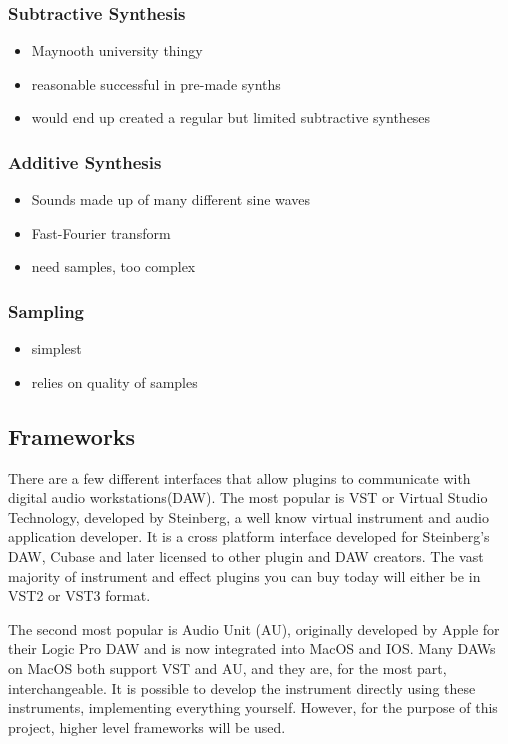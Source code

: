 \documentclass[12pt]{article}
\begin{document}
	\subsubsection{Subtractive Synthesis}
	\begin{itemize}
		\item Maynooth university thingy
		\item reasonable successful in pre-made synths
		\item would end up created a regular but limited subtractive syntheses
	\end{itemize}
	
	\subsubsection{Additive Synthesis}
	\begin{itemize}
		\item Sounds made up of many different sine waves
		\item Fast-Fourier transform
		\item need samples, too complex
	\end{itemize}
	
	\subsubsection{Sampling}
	\begin{itemize}
		\item simplest
		\item relies on quality of samples
	\end{itemize}


	\subsection{Frameworks}
	There are a few different interfaces that allow plugins to communicate with digital audio workstations(DAW). 
	The most popular is VST or Virtual Studio Technology, developed by Steinberg, a well know virtual instrument and audio application developer. 
	It is a cross platform interface developed for Steinberg's DAW, Cubase and later licensed to other plugin and DAW creators.
	The vast majority of instrument and effect plugins you can buy today will either be in VST2 or VST3 format. 
	
	The second most popular is Audio Unit (AU), originally developed by Apple for their Logic Pro DAW and is now integrated into MacOS and IOS. 
	Many DAWs on MacOS both support VST and AU, and they are, for the most part, interchangeable. 
	It is possible to develop the instrument directly using these instruments, implementing everything yourself. However, for the purpose of this project, 
	higher level frameworks will be used.
	
\end{document}
